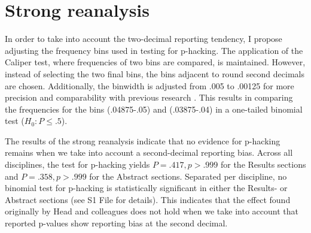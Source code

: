 \section*{Strong reanalysis}
In order to take into account the two-decimal reporting tendency, I propose adjusting the frequency bins used in testing for p-hacking. The application of the Caliper test, where frequencies of two bins are compared, is maintained. However, instead of selecting the two final bins, the bins adjacent to round second decimals are chosen. Additionally, the binwidth is adjusted from .005 to .00125 for more precision and comparability with previous research \cite{Masicampo2012, Leggett2013}. This results in comparing the frequencies for the bins (.04875-.05) and (.03875-.04) in a one-tailed binomial test ($H_0: P \leq .5$).

The results of the strong reanalysis indicate that no evidence for p-hacking remains when we take into account a second-decimal reporting bias. Across all disciplines, the test for p-hacking yields $P=.417,p>.999$ for the Results sections and $P=.358,p>.999$ for the Abstract sections. Separated per discipline, no binomial test for p-hacking is statistically significant in either the Results- or Abstract sections (see S1 File for details). This indicates that the effect found originally by Head and colleagues does not hold when we take into account that reported p-values show reporting bias at the second decimal.